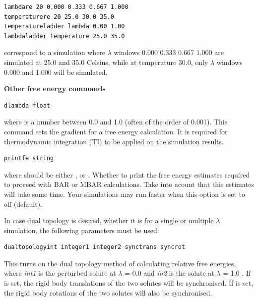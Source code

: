 \documentclass[letterpaper,10pt,english]{sphinxmanual}
\begin{document}
\begin{Verbatim}[commandchars=\\\{\}]
lambdare 20 0.000 0.333 0.667 1.000
temperaturere 20 25.0 30.0 35.0
temperatureladder lambda 0.00 1.00
lambdaladder temperature 25.0 35.0
\end{Verbatim}

correspond to a simulation where \(\lambda\) windows 0.000 0.333 0.667 1.000 are simulated at 25.0 and 35.0 Celsius, while at temperature 30.0, only \(\lambda\) windows 0.000 and 1.000 will be simulated.

\textbf{Other free energy commands}

\begin{Verbatim}[commandchars=\\\{\}]
dlambda float
\end{Verbatim}

where  is a number between 0.0 and 1.0 (often of the order of 0.001). This command sets the gradient for a free energy calculation. It is required for thermodynamic integration (TI) to be applied on the simulation results.

\begin{Verbatim}[commandchars=\\\{\}]
printfe string
\end{Verbatim}

where  should be either ,  or . Whether to print the free energy estimates required to proceed with BAR or MBAR calculations. Take into acount that this estimates will take some time. Your simulations may run faster when this option is set to off (default).

In case dual topology is desired, whether it is for a single or multiple \(\lambda\) simulation, the following parameters must be used:

\begin{Verbatim}[commandchars=\\\{\}]
dualtopologyint integer1 integer2 synctrans syncrot
\end{Verbatim}

This turns on the dual topology method of calculating relative free energies, where \emph{int1} is the perturbed solute at \(\lambda\) = 0.0 and \emph{in2} is the solute at \(\lambda\) = 1.0 . If  is set, the rigid body translations of the two solutes will be synchronised. If  is set, the rigid body rotations of the two solutes will also be synchronised.
\end{document}
